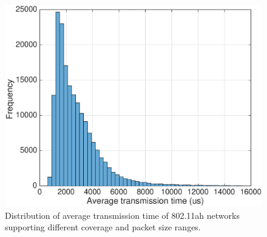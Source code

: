 


\begin{figure}[t]
  \centering
  \includegraphics[width=0.75\columnwidth]{figures/histTx}
  \caption{Distribution of average transmission time of 802.11ah networks supporting different coverage and packet size ranges. \label{fig:tx-hist}}
\end{figure}




